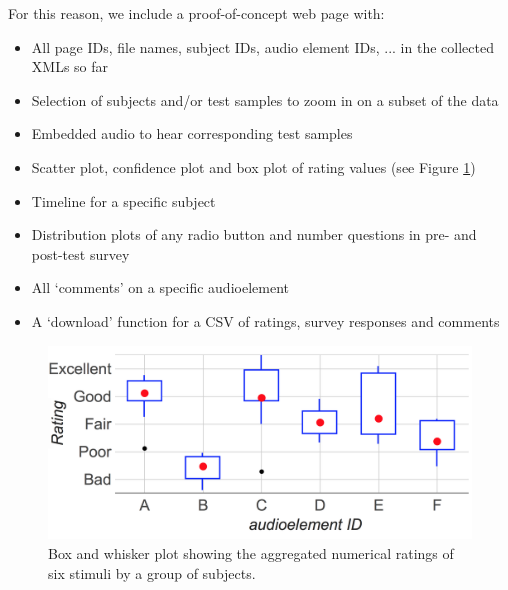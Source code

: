 \documentclass{sig-alternate}
\begin{document}
	For this reason, we include a proof-of-concept web page with:
	\begin{itemize}[noitemsep,nolistsep]
		\item All page IDs, file names, subject IDs, audio element IDs, ... in the collected XMLs so far
		\item Selection of subjects and/or test samples to zoom in on a subset of the data %
		\item Embedded audio to hear corresponding test samples %
		\item Scatter plot, confidence plot and box plot of rating values (see Figure \ref{fig:boxplot})
		\item Timeline for a specific subject %
		\item Distribution plots of any radio button and number questions in pre- and post-test survey %
		\item All `comments' on a specific audioelement
		\item A `download' function for a CSV of ratings, survey responses and comments%
	\end{itemize}

	\begin{figure}[tbh]
		\centering
		\includegraphics[width=.5\textwidth]{boxplot.png}
		\caption{Box and whisker plot showing the aggregated numerical ratings of six stimuli by a group of subjects.}
		\label{fig:boxplot}
	\end{figure}
\end{document}
